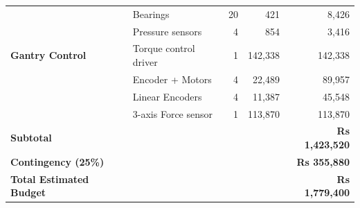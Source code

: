 \begin{appendices}
\begin{table}[H]
\begin{tabular}{@{}l l r r r@{}}
     & Bearings & 20 & 421 & 8,426 \\
     & Pressure sensors & 4 & 854 & 3,416 \\
    \addlinespace
    \textbf{Gantry Control} & Torque control driver & 1 & 142,338 & 142,338 \\
     & Encoder + Motors & 4 & 22,489 & 89,957 \\
     & Linear Encoders & 4 & 11,387 & 45,548 \\
     & 3-axis Force sensor & 1 & 113,870 & 113,870 \\
    \midrule
    \textbf{Subtotal} & & & & \textbf{Rs 1,423,520} \\
    \textbf{Contingency (25\%)} & & & & \textbf{Rs 355,880} \\
    \midrule
    \textbf{Total Estimated Budget} & & & & \textbf{Rs 1,779,400} \\
    \bottomrule
  \end{tabular}
\end{table}



\end{appendices}

